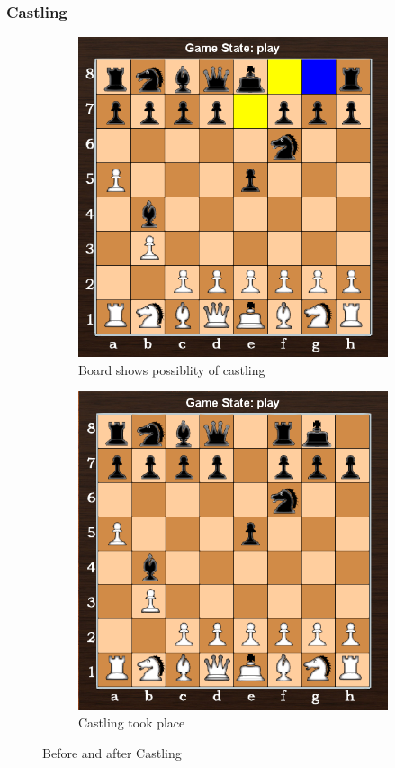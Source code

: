 \documentclass[11pt,a4paper]{article}
\begin{document}
\subsubsection{Castling}
\begin{figure}[H]
\centering
\begin{subfigure}{0.5\textwidth}
  \centering
  \includegraphics[width=0.9\linewidth]{Castling1}
  \caption{Board shows possiblity of castling}
  \label{fig:sub1}
\end{subfigure}%
\begin{subfigure}{0.5\textwidth}
  \centering
  \includegraphics[width=0.9\linewidth]{Castling2}
  \caption{Castling took place}
  \label{fig:sub2}
\end{subfigure}
\caption{Before and after Castling}
\label{fig:test}
\end{figure}
\end{document}
